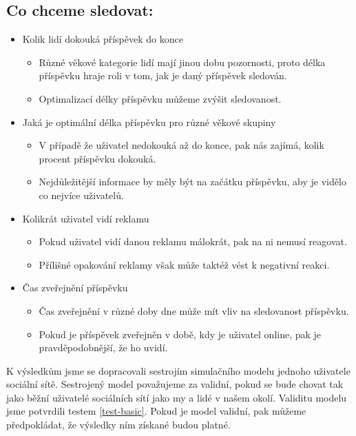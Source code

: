 \documentclass[11pt, a4paper]{article}
\begin{document}
\subsection{Co chceme sledovat:}
\begin{itemize}
    \item Kolik lidí dokouká příspěvek do konce
    \begin{itemize}
        \item Různé věkové kategorie lidí mají jinou dobu pozornosti, proto délka příspěvku hraje roli v tom, jak je daný příspěvek sledován.
        \item Optimalizací délky příspěvku můžeme zvýšit sledovanost.
    \end{itemize}
    \item Jaká je optimální délka příspěvku pro různé věkové skupiny
    \begin{itemize}
        \item V případě že uživatel nedokouká až do konce, pak nás zajímá, kolik procent příspěvku dokouká.
        \item Nejdůležitější informace by měly být na začátku příspěvku, aby je vidělo co nejvíce uživatelů.
    \end{itemize}
    \item Kolikrát uživatel vidí reklamu
    \begin{itemize}
        \item Pokud uživatel vidí danou reklamu málokrát, pak na ni nemusí reagovat.
        \item Přílišné opakování reklamy však může taktéž vést k negativní reakci.
    \end{itemize}
    \item Čas zveřejnění příspěvku 
    \begin{itemize}
        \item Čas zveřejnění v různé doby dne může mít vliv na sledovanost příspěvku.
        \item Pokud je příspěvek zveřejněn v době, kdy je uživatel online, pak je pravděpodobnější, že ho uvidí.
    \end{itemize}
\end{itemize}
K výsledkům jsme se dopracovali sestrojím simulačního modelu jednoho uživatele sociální sítě. Sestrojený model považujeme za validní, pokud se bude chovat tak jako běžní uživatelé sociálních sítí jako my a lidé v našem okolí. 
Validitu modelu jsme potvrdili testem \ref{test-basic}.
Pokud je model validní, pak můžeme předpokládat, že výsledky ním získané budou platné.
\newpage
\end{document}
